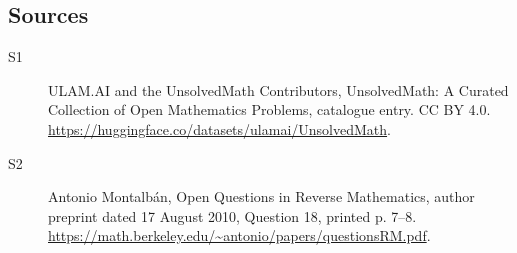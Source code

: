 \documentclass[11pt]{article}
\begin{document}
\subsection{Sources}
\begin{description}
\item[\hypertarget{source:statement:1}{S1}] ULAM.AI and the UnsolvedMath Contributors, UnsolvedMath: A Curated Collection of Open Mathematics Problems, catalogue entry. CC BY 4.0. \url{https://huggingface.co/datasets/ulamai/UnsolvedMath}.
\item[\hypertarget{source:statement:2}{S2}] Antonio Montalbán, Open Questions in Reverse Mathematics, author preprint dated 17 August 2010, Question 18, printed p. 7--8. \url{https://math.berkeley.edu/~antonio/papers/questionsRM.pdf}.
\end{description}
\label{end:statement}
\end{document}
